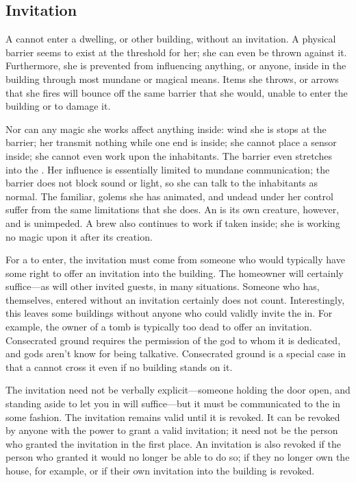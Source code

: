 \subsection{Invitation}

A {\vampire} cannot enter a dwelling, or other building, without an invitation.
A physical barrier seems to exist at the threshold for her; she can even be thrown against it.
Furthermore, she is prevented from influencing anything, or anyone, inside in the building through most mundane or magical means.
Items she throws, or arrows that she fires will bounce off the same barrier that she would, unable to enter the building or to damage it.

Nor can any magic she works affect anything inside: wind she is  stops at the barrier; her {\symlinks} transmit nothing while one end is inside; she cannot place a  sensor inside; she cannot even work  upon the inhabitants.
The barrier even stretches into the {\mentalrealm}.
Her influence is essentially limited to mundane communication; the barrier does not block sound or light, so she can talk to the inhabitants as normal.
The {\vampirepossessive} familiar, golems she has animated, and undead under her control suffer from the same limitations that she does.
An  is its own creature, however, and is unimpeded.
A {\vampirepossessive} brew also continues to work if taken inside; she is working no magic upon it after its creation.

For a {\vampire} to enter, the invitation must come from someone who would typically have some right to offer an invitation into the building.
The homeowner will certainly suffice---as will other invited guests, in many situations.
Someone who has, themselves, entered without an invitation certainly does not count.
Interestingly, this leaves some buildings without anyone who could validly invite the {\vampire} in.
For example, the owner of a tomb is typically too dead to offer an invitation.
Consecrated ground requires the permission of the god to whom it is dedicated, and gods aren't know for being talkative.
Consecrated ground is a special case in that a {\vampire} cannot cross it even if no building stands on it.

The invitation need not be verbally explicit---someone holding the door open, and standing aside to let you in will suffice---but it must be communicated to the {\vampire} in some fashion.
The invitation remains valid until it is revoked.
It can be revoked by anyone with the power to grant a valid invitation; it need not be the person who granted the invitation in the first place.
An invitation is also revoked if the person who granted it would no longer be able to do so; if they no longer own the house, for example, or if their own invitation into the building is revoked.

